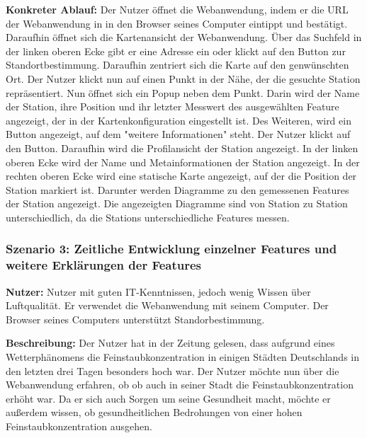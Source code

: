 \textbf{Konkreter Ablauf:} Der Nutzer öffnet die \gls{Webanwendung}, indem er die URL der \gls{Webanwendung} in in den Browser seines Computer eintippt 
und bestätigt. Daraufhin öffnet sich die Kartenansicht der \gls{Webanwendung}. Über das Suchfeld in der linken oberen Ecke gibt 
er eine Adresse ein oder klickt auf den Button zur Standortbestimmung. Daraufhin zentriert sich die Karte auf den genwünschten Ort. 
Der Nutzer klickt nun auf einen Punkt in der Nähe, der die gesuchte \gls{Station} repräsentiert. Nun öffnet sich ein Popup neben 
dem Punkt. Darin wird der Name der \gls{Station}, ihre Position und ihr letzter \gls{Messwert} des ausgewählten \gls{Feature} 
angezeigt, der in der Kartenkonfiguration eingestellt ist. Des Weiteren, wird ein Button angezeigt, auf dem "weitere Informationen" 
steht. Der Nutzer klickt auf den Button.
Daraufhin wird die Profilansicht der \gls{Station} angezeigt. In der linken oberen Ecke wird der Name und Metainformationen 
der \gls{Station} angezeigt. In der rechten oberen Ecke wird eine statische Karte angezeigt, auf der die Position der \gls{Station} 
markiert ist.
Darunter werden Diagramme zu den gemessenen Features der \gls{Station} angezeigt. Die angezeigten Diagramme sind von \gls{Station} 
zu \gls{Station} unterschiedlich, da die \glspl{Station} unterschiedliche Features messen.

\newpage
\subsubsection*{Szenario 3: Zeitliche Entwicklung einzelner \glspl{Feature} und weitere Erklärungen der \glspl{Feature}}
\textbf{Nutzer:} Nutzer mit guten IT-Kenntnissen, jedoch wenig Wissen über Luftqualität. Er verwendet die \gls{Webanwendung}
mit seinem Computer. Der Browser seines Computers unterstützt Standorbestimmung.

\textbf{Beschreibung:} Der Nutzer hat in der Zeitung gelesen, dass aufgrund eines Wetterphänomens die Feinstaubkonzentration in
einigen Städten Deutschlands in den letzten drei Tagen besonders hoch war. Der Nutzer möchte nun über die \gls{Webanwendung} erfahren, ob
ob auch in seiner Stadt die Feinstaubkonzentration erhöht war. Da er sich auch Sorgen um seine Gesundheit macht, möchte er außerdem 
wissen, ob gesundheitlichen Bedrohungen von einer hohen Feinstaubkonzentration ausgehen.


